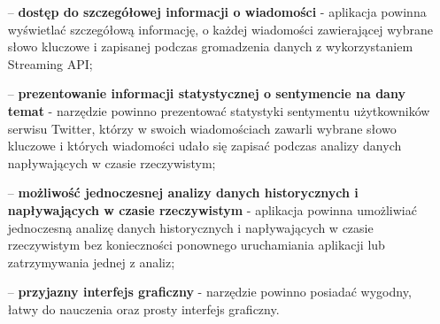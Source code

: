 \begin{itemize}
	\item[--] \textbf{dostęp do szczegółowej informacji o wiadomości} - aplikacja powinna wyświetlać szczegółową informację, o każdej wiadomości zawierającej wybrane słowo kluczowe i zapisanej podczas gromadzenia danych z wykorzystaniem Streaming API;
	\item[--] \textbf{prezentowanie informacji statystycznej o sentymencie na dany temat} - narzędzie powinno prezentować statystyki sentymentu użytkowników serwisu Twitter, którzy w swoich wiadomościach zawarli wybrane słowo kluczowe i których wiadomości udało się zapisać podczas analizy danych napływających w czasie rzeczywistym;
	\item[--] \textbf{możliwość jednoczesnej analizy danych historycznych i napływających w czasie rzeczywistym} - aplikacja powinna umożliwiać jednoczesną analizę danych historycznych i napływających w czasie rzeczywistym bez konieczności ponownego uruchamiania aplikacji lub zatrzymywania jednej z analiz;
	\item[--] \textbf{przyjazny interfejs graficzny} - narzędzie powinno posiadać wygodny, łatwy do nauczenia oraz prosty interfejs graficzny.
\end{itemize}


